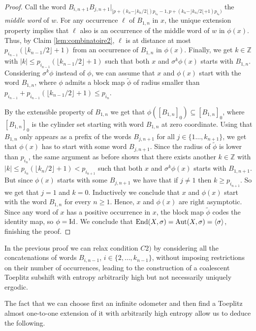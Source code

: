 \documentclass{daj}
\theoremstyle{plain}
\theoremstyle{definition}
\begin{document}
\begin{proof}
	Call the  word  $B_{i,n+1}B_{j,n+1}|_{[p+ (k_{n}-\rfloor k_{n}/2 \lfloor) p_{i_{n}} -1, p+ (k_{n}-\rfloor k_{n}/2 \lfloor +1) p_{i_{n}}) }$ the {\em  middle word}  of $w$. 
	For any occurrence $\ell$  of $B_{1,n}$ in $x$,  the  unique extension property implies that $\ell$  also is an occurrence of the middle word  of $w$ in $\phi(x)$. Thus, by  Claim \eqref{lem:combinatoire2}, $\ell$ is at distance at most $p_{i_{n-1}}(\lfloor k_{n-1}/2 \rfloor +1)$ from an occurrence of $B_{1,n}$ in $\phi(x)$. 
	Finally, we get $k \in \mathbb{Z}$ with $|k| \le p_{i_{n-1}}(\lfloor k_{n-1}/2 \rfloor +1)$ such that both $x$ and $\sigma^k \phi(x)$ starts with $B_{1,n}$.
	Considering $\sigma^k \phi$ instead of $\phi$,  we can assume that $x$ and $\phi(x)$ start with the word $B_{1,n}$, where $\phi$ admits a block map $\tilde{\phi}$ of radius smaller than 
	$p_{i_{n-1}} + p_{i_{n-1}}(\lfloor k_{n-1}/2 \rfloor +1) \le p_{i_{n}}$.
	
	By the extensible property of $B_{1,n}$ we get that $\phi([B_{1,n}]_0) \subseteq [B_{1,n}]_0$, where $[B_{1,n}]_0$ is the cylinder set starting with word $B_{1,n}$ at zero coordinate. Using that $B_{1,n}$ only appears as a prefix of the words $B_{j,n+1}$ for all $j\in \{1\ldots,k_{n+1}\}$, we get that $\phi(x)$ has to start with some word $B_{j,n+1}$. Since the radius of $\tilde{\phi}$ is lower than $p_{i_{n}}$, the same argument as before shows that there exists another $k\in \mathbb{Z}$ with $|k| \le p_{i_{n}}(\lfloor k_{n}/2 \rfloor +1)< p_{i_{n+1}}$ such that both $x$ and $\sigma^k \phi(x)$ starts with $B_{1,n+1}$. But since $\phi(x)$ starts with some  $B_{j,n+1}$ we have that if $j\neq 1$ then $k\geq p_{i_{n+1}}$. So we get that $j=1$ and $k=0$. Inductively we conclude that $x$ and $\phi(x)$ start with the word $B_{1,n}$ for every $n\geq 1$. Hence, $x$ and $\phi(x)$ are right asymptotic. Since  any word of $x$ has a positive occurrence in $x$, the block map $\tilde{\phi}$ codes the identity map, so $\phi = {\rm Id}$. We conclude that  ${\rm End}(X,\sigma)={\rm Aut}(X,\sigma)=\langle \sigma \rangle$, finishing the proof. 
\end{proof}

In the previous proof we can relax condition $C2)$ by considering all the concatenations of words $B_{i,n-1}$, $i \in \{2, \ldots, k_{n-1}\}$, without imposing restrictions on their number of occurrences, leading to the construction of a coalescent Toeplitz subshift with entropy arbitrarily high but not necessarily uniquely ergodic.  

The fact that we can choose first an infinite odometer and then find a Toeplitz almost one-to-one extension of it with arbitrarily high entropy allow us to deduce  the following.
\end{document}
